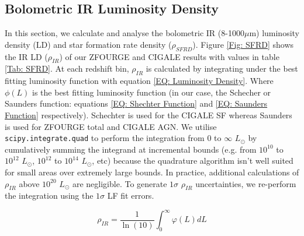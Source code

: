 \subsection{Bolometric IR Luminosity Density} \label{Sec: IR Density}

In this section, we calculate and analyse the bolometric IR (8-1000$\mu$m) luminosity density (LD) and star formation rate density ($\rho_{SFRD}$). Figure \ref{Fig: SFRD} shows the IR LD ($\rho_{IR}$) of our ZFOURGE and CIGALE results with values in table \ref{Tab: SFRD}. At each redshift bin, $\rho_{IR}$ is calculated by integrating under the best fitting luminosity function with equation \ref{EQ: Luminosity Density}. Where $\phi(L)$ is the best fitting luminosity function (in our case, the Schecher or Saunders function: equations \ref{EQ: Shechter Function} and \ref{EQ: Saunders Function} respectively). Schechter is used for the CIGALE SF whereas Saunders is used for ZFOURGE total and CIGALE AGN. We utilise \texttt{scipy.integrate.quad} \citep{virtanen_scipy_2020} to perform the integration from $0$ to $\infty$ $L_{\odot}$ by cumulatively summing the integrand at incremental bounds (e.g. from $10^{10}$ to $10^{12}$ $L_{\odot}$, $10^{12}$ to $10^{14}$ $L_{\odot}$, etc) because the quadrature algorithm isn't well suited for small areas over extremely large bounds. In practice, additional calculations of $\rho_{IR}$ above $10^{20}$ $L_{\odot}$ are negligible. To generate $1\sigma$ $\rho_{IR}$ uncertainties, we re-perform the integration using the $1 \sigma$ LF fit errors.

\begin{equation} 
    \rho_{IR} = \frac{1}{\ln(10)} \int_{0}^{\infty} \varphi(L) dL 
    \label{EQ: Luminosity Density}
\end{equation}

